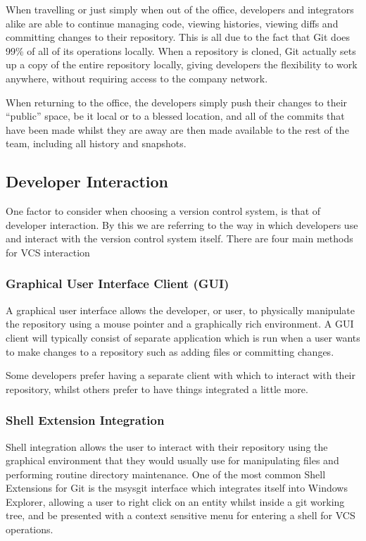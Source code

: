 When travelling or just simply when out of the office, developers and integrators alike are able to continue managing code, viewing histories, viewing diffs and committing changes to their repository.
This is all due to the fact that Git does 99\% of all of its operations locally.
When a repository is cloned, Git actually sets up a copy of the entire repository locally, giving developers the flexibility to work anywhere, without requiring access to the company network.

When returning to the office, the developers simply push their changes to their ``public'' space, be it local or to a blessed location, and all of the commits that have been made whilst they are away are then made available to the rest of the team, including all history and snapshots.

\subsection{Developer Interaction}
One factor to consider when choosing a version control system, is that of developer interaction.
By this we are referring to the way in which developers use and interact with the version control system itself.
There are four main methods for VCS interaction

\subsubsection{Graphical User Interface Client (GUI)}
A graphical user interface allows the developer, or user, to physically manipulate the repository using a mouse pointer and a graphically rich environment.
A GUI client will typically consist of separate application which is run when a user wants to make changes to a repository such as adding files or committing changes.

Some developers prefer having a separate client with which to interact with their repository, whilst others prefer to have things integrated a little more.

\subsubsection{Shell Extension Integration}
Shell integration allows the user to interact with their repository using the graphical environment that they would usually use for manipulating files and performing routine directory maintenance.
One of the most common Shell Extensions for Git is the msysgit interface which integrates itself into Windows Explorer, allowing a user to right click on an entity whilst inside a git working tree, and be presented with a context sensitive menu for entering a shell for VCS operations.

